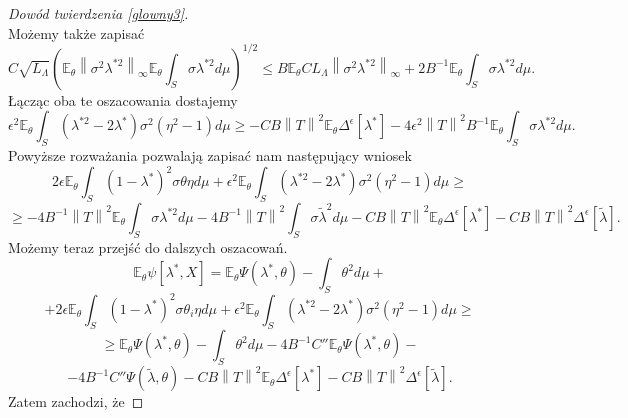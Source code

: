 \documentclass{mwart}
\newcommand{\norm}[1]{\left\lVert#1\right\rVert}
\begin{document}
\begin{proof}[Dowód twierdzenia \ref{glowny3}]
\begin{displaymath}
\end{displaymath}
Możemy także zapisać
\begin{displaymath}
C\sqrt{L_{\Lambda}}\left(\mathbb{E}_{\theta}\norm{\sigma^2\lambda^{*2}}_{\infty}\mathbb{E}_{\theta}\int_S\sigma\lambda^{*2}d\mu\right)^{1/2}
\leq B\mathbb{E}_{\theta}CL_{\Lambda}\norm{\sigma^2\lambda^{*2}}_{\infty}+2B^{-1}\mathbb{E}_{\theta}\int_S\sigma\lambda^{*2}d\mu.
\end{displaymath}
Łącząc oba te oszacowania dostajemy
\begin{displaymath}
\epsilon^2\mathbb{E}_{\theta}\int_S(\lambda^{*2}-2\lambda^*)\sigma^2(\eta^2-1)d\mu\geq
-CB\norm{T}^2\mathbb{E}_{\theta}\Delta^{\epsilon}[\lambda^*]-4\epsilon^2\norm{T}^2B^{-1}\mathbb{E}_{\theta}\int_S\sigma\lambda^{*2}d\mu.
\end{displaymath}
Powyższe rozważania pozwalają zapisać nam następujący wniosek
\begin{displaymath}
2\epsilon\mathbb{E}_{\theta}\int_S(1-\lambda^*)^2\sigma \theta \eta d\mu+\epsilon^2\mathbb{E}_{\theta}\int_S(\lambda^{*2}-2\lambda^*)\sigma^2(\eta^2-1)d\mu\geq
\end{displaymath}
\begin{displaymath}
\geq -4B^{-1}\norm{T}^2\mathbb{E}_{\theta}\int_S\sigma\lambda^{*2}d\mu -4B^{-1}\norm{T}^2\int_S\sigma\tilde{\lambda}^2d\mu-CB\norm{T}^2\mathbb{E}_{\theta}\Delta^{\epsilon}[\lambda^*]-CB\norm{T}^2\Delta^{\epsilon}[\tilde{\lambda}].
\end{displaymath}
Możemy teraz przejść do dalszych oszacowań.
\begin{displaymath}
\mathbb{E}_{\theta}\psi[\lambda^*,X]=\mathbb{E}_{\theta}\Psi(\lambda^*,\theta)-\int_S\theta ^2d\mu+
\end{displaymath}
\begin{displaymath}
+2\epsilon\mathbb{E}_{\theta}\int_S(1-\lambda^*)^2\sigma \theta_i \eta d\mu+\epsilon^2\mathbb{E}_{\theta}\int_S(\lambda^{*2}-2\lambda^*)\sigma^2(\eta^2-1)d\mu \geq
\end{displaymath}
\begin{displaymath}
\geq \mathbb{E}_{\theta}\Psi(\lambda^*,\theta)-\int_S\theta ^2d\mu-4B^{-1}C''\mathbb{E}_{\theta}\Psi(\lambda^*,\theta)-
\end{displaymath}
\begin{displaymath}
-4B^{-1}C''\Psi(\tilde{\lambda},\theta)-CB\norm{T}^2\mathbb{E}_{\theta}\Delta^{\epsilon}[\lambda^*]-CB\norm{T}^2\Delta^{\epsilon}[\tilde{\lambda}].
\end{displaymath}
Zatem zachodzi, że

\end{proof}
\end{document}
